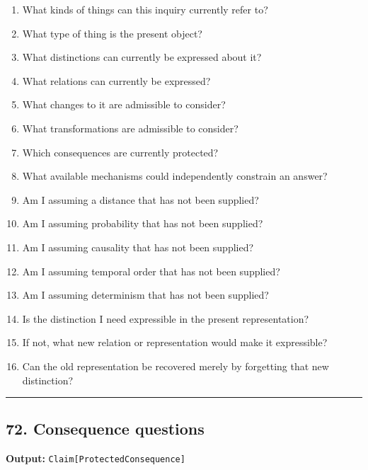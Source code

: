 \documentclass[
]{article}
\providecommand{\tightlist}{%
  \setlength{\itemsep}{0pt}\setlength{\parskip}{0pt}}
\begin{document}
\begin{enumerate}
\def\labelenumi{\arabic{enumi}.}
\tightlist
\item
  What kinds of things can this inquiry currently refer to?
\item
  What type of thing is the present object?
\item
  What distinctions can currently be expressed about it?
\item
  What relations can currently be expressed?
\item
  What changes to it are admissible to consider?
\item
  What transformations are admissible to consider?
\item
  Which consequences are currently protected?
\item
  What available mechanisms could independently constrain an answer?
\item
  Am I assuming a distance that has not been supplied?
\item
  Am I assuming probability that has not been supplied?
\item
  Am I assuming causality that has not been supplied?
\item
  Am I assuming temporal order that has not been supplied?
\item
  Am I assuming determinism that has not been supplied?
\item
  Is the distinction I need expressible in the present representation?
\item
  If not, what new relation or representation would make it expressible?
\item
  Can the old representation be recovered merely by forgetting that new
  distinction?
\end{enumerate}

\begin{center}\rule{0.5\linewidth}{0.5pt}\end{center}

\subsection{72. Consequence questions}\label{consequence-questions}

\textbf{Output:} \texttt{Claim{[}ProtectedConsequence{]}}
\end{document}
